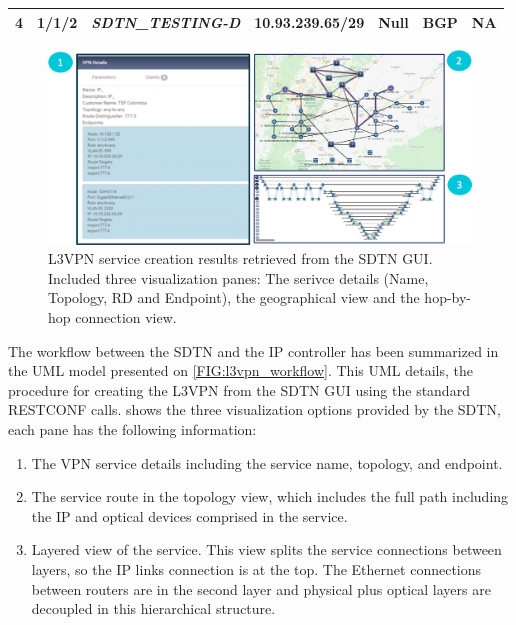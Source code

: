 \documentclass[a4paper,fleqn]{cas-dc}
\begin{document}
\begin{table}[]
\begin{tabular}{c|c|c|l|c|cl}
\multicolumn{1}{|c|}{\multirow{-2}{*}{\textbf{4}}}          & 1/1/2                                                           & \multirow{-2}{*}{\textit{SDTN\_TESTING-D}}                & 10.93.239.65/29       & \multirow{-2}{*}{Null}                                          & \multicolumn{1}{c|}{\multirow{-2}{*}{BGP}}                          & \multicolumn{1}{l|}{\multirow{-2}{*}{NA}}                     \\ \hline
\end{tabular}
\label{TAB:discovered_ip_l3vpn}
\end{table}


\begin{figure}
	\centering
		\includegraphics[width=\linewidth]{figs/l3vpn_results.png}
	\caption{L3VPN service creation results retrieved from the SDTN GUI. Included three visualization panes: The serivce details (Name, Topology, RD and Endpoint), the geographical view and the hop-by-hop connection view.}
	\label{FIG:l3vpn_results}
\end{figure}

The workflow between the SDTN and the IP controller has been summarized in the UML model presented on \cref{FIG:l3vpn_workflow}. This UML details, the procedure for creating the L3VPN from the SDTN GUI using the standard RESTCONF calls. 
 shows the three visualization options provided by the SDTN, each pane has the following information:
\begin{enumerate}
    \item The VPN service details including the service name, topology, and endpoint.
    \item The service route in the topology view, which includes the full path including the IP and optical devices comprised in the service.
    \item Layered view of the service. This view splits the service connections between layers, so the IP links connection is at the top. The Ethernet connections between routers are in the second layer and physical plus optical layers are decoupled in this hierarchical structure.
\end{enumerate}
\end{document}
